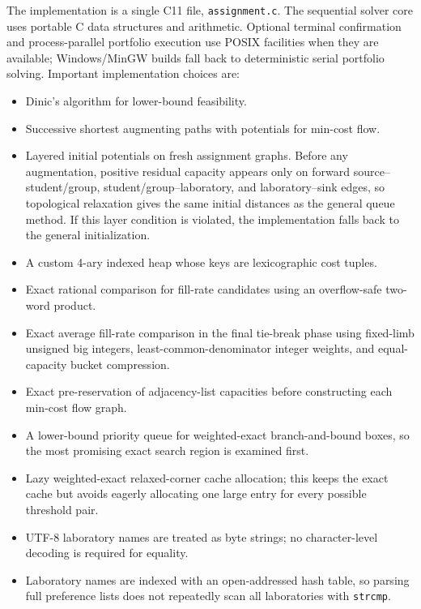 \documentclass[11pt,a4paper]{article}
\begin{document}
The implementation is a single C11 file, \texttt{assignment.c}.  The sequential
solver core uses portable C data structures and arithmetic.  Optional terminal
confirmation and process-parallel portfolio execution use POSIX facilities
when they are available; Windows/MinGW builds fall back to deterministic serial
portfolio solving.  Important implementation choices are:
\begin{itemize}[leftmargin=2em]
  \item Dinic's algorithm for lower-bound feasibility.
  \item Successive shortest augmenting paths with potentials for min-cost
        flow.
  \item Layered initial potentials on fresh assignment graphs.  Before any
        augmentation, positive residual capacity appears only on forward
        source--student/group, student/group--laboratory, and
        laboratory--sink edges, so topological relaxation gives the same
        initial distances as the general queue method.  If this layer
        condition is violated, the implementation falls back to the general
        initialization.
  \item A custom 4-ary indexed heap whose keys are lexicographic cost tuples.
  \item Exact rational comparison for fill-rate candidates using an
        overflow-safe two-word product.
  \item Exact average fill-rate comparison in the final tie-break phase using
        fixed-limb unsigned big integers, least-common-denominator integer
        weights, and equal-capacity bucket compression.
  \item Exact pre-reservation of adjacency-list capacities before constructing
        each min-cost flow graph.
  \item A lower-bound priority queue for weighted-exact branch-and-bound boxes,
        so the most promising exact search region is examined first.
  \item Lazy weighted-exact relaxed-corner cache allocation; this keeps the
        exact cache but avoids eagerly allocating one large entry for every
        possible threshold pair.
  \item UTF-8 laboratory names are treated as byte strings; no character-level
        decoding is required for equality.
  \item Laboratory names are indexed with an open-addressed hash table, so
        parsing full preference lists does not repeatedly scan all laboratories
        with \texttt{strcmp}.

\end{itemize}
\end{document}
